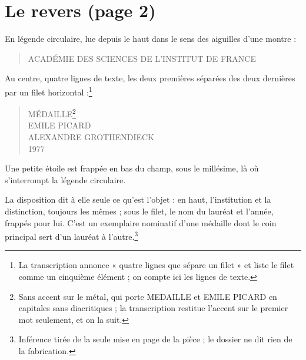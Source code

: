 \documentclass[11pt,a4paper]{article}
\begin{document}
\section*{Le revers (page 2)}

En légende circulaire, lue depuis le haut dans le sens des aiguilles d'une
montre :
\begin{quote}
ACADÉMIE DES SCIENCES DE L'INSTITUT DE FRANCE
\end{quote}
Au centre, quatre lignes de texte, les deux premières séparées des deux
dernières par un filet horizontal :\footnote{La transcription annonce
« quatre lignes que sépare un filet » et liste le filet comme un cinquième
élément ; on compte ici les lignes de texte.}
\begin{quote}
MÉDAILLE\footnote{Sans accent sur le métal, qui porte MEDAILLE et EMILE
PICARD en capitales sans diacritiques ; la transcription restitue l'accent
sur le premier mot seulement, et on la suit.}\\
EMILE PICARD\\
ALEXANDRE GROTHENDIECK\\
1977
\end{quote}
Une petite étoile est frappée en bas du champ, sous le millésime, là où
s'interrompt la légende circulaire.

La disposition dit à elle seule ce qu'est l'objet : en haut, l'institution et
la distinction, toujours les mêmes ; sous le filet, le nom du lauréat et
l'année, frappés pour lui. C'est un exemplaire nominatif d'une médaille dont
le coin principal sert d'un lauréat à l'autre.\footnote{Inférence tirée de la
seule mise en page de la pièce ; le dossier ne dit rien de la fabrication.}
\end{document}
